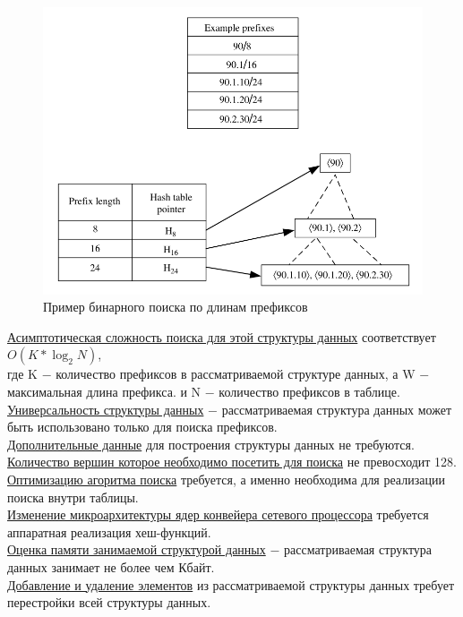 \documentclass[a4peper, 12pt, titlepage, finall]{report}
\begin{document}
            \begin{figure}[h]
                \includegraphics[width=\textwidth]{binary_search.png}
                \caption{Пример бинарного поиска по длинам префиксов}\label{fig:mesh4}
            \end{figure}


            \underline{Асимптотическая сложность поиска для этой структуры данных} соответствует {\ttfamily $O(K*\log_2{N})$},\\
            где {\ttfamily K} $-$ количество префиксов в рассматриваемой структуре данных, а {\ttfamily W} $-$ максимальная длина префикса.
            и {\ttfamily N} $-$ количество префиксов в таблице.\\
            \underline{Универсальность структуры данных} $-$ рассматриваемая структура данных может быть использовано только для поиска префиксов.\\
            \underline{Дополнительные данные} для построения структуры данных не требуются.\\
            \underline{Количество вершин которое необходимо посетить для поиска} не превосходит 128.\\
            \underline{Оптимизацию агоритма поиска} требуется, а именно необходима для реализации поиска внутри таблицы.\\
            \underline{Изменение микроархитектуры ядер конвейера сетевого процессора} требуется аппаратная реализация хеш-функций.\\
            \underline{Оценка памяти занимаемой структурой данных} $-$ рассматриваемая структура данных занимает не более чем Кбайт.\\
            \underline{Добавление и удаление элементов} из рассматриваемой структуры данных требует перестройки всей структуры данных.\\
\end{document}
